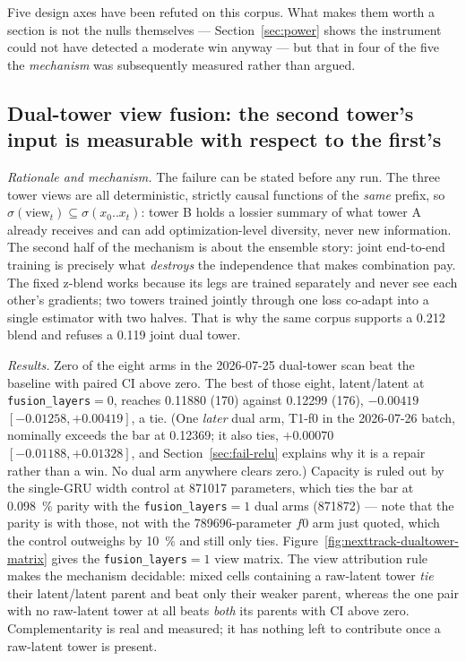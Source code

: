 \documentclass[11pt]{article}
\begin{document}
Five design axes have been refuted on this corpus. What makes them worth a
section is not the nulls themselves --- Section~\ref{sec:power} shows the
instrument could not have detected a moderate win anyway --- but that in four of
the five the \emph{mechanism} was subsequently measured rather than argued.

\subsection{Dual-tower view fusion: the second tower's input is measurable with respect to the first's}
\label{sec:fail-views}

\emph{Rationale and mechanism.} The failure can be stated before any run. The
three tower views are all deterministic, strictly causal functions of the
\emph{same} prefix, so $\sigma(\text{view}_t)\subseteq\sigma(x_0..x_t)$: tower B
holds a lossier summary of what tower A already receives and can add
optimization-level diversity, never new information. The second half of the
mechanism is about the ensemble story: joint end-to-end training is precisely
what \emph{destroys} the independence that makes combination pay. The fixed
z-blend works because its legs are trained separately and never see each other's
gradients; two towers trained jointly through one loss co-adapt into a single
estimator with two halves. That is why the same corpus supports a \num{0.212}
blend and refuses a \num{0.119} joint dual tower.

\emph{Results.} Zero of the eight arms in the 2026-07-25 dual-tower scan beat the
baseline with paired CI above zero. The best of those eight, latent/latent at
\texttt{fusion\_layers}${}=0$, reaches \num{0.11880} (\num{170}) against
\num{0.12299} (\num{176}), $-\num{0.00419}$
$[-\num{0.01258},+\num{0.00419}]$, a tie. (One \emph{later} dual arm, T1-f0 in
the 2026-07-26 batch, nominally exceeds the bar at \num{0.12369}; it also ties,
$+\num{0.00070}$ $[-\num{0.01188},+\num{0.01328}]$, and
Section~\ref{sec:fail-relu} explains why it is a repair rather than a win. No
dual arm anywhere clears zero.) Capacity is ruled out by the single-GRU width
control at \num{871017} parameters, which ties the bar at \SI{0.098}{\percent}
parity with the \texttt{fusion\_layers}${}=1$ dual arms (\num{871872}) --- note
that the parity is with those, not with the \num{789696}-parameter $f0$ arm just
quoted, which the control outweighs by \SI{10}{\percent} and still only ties.
Figure~\ref{fig:nexttrack-dualtower-matrix} gives the
\texttt{fusion\_layers}${}=1$ view matrix. The view attribution rule makes the
mechanism decidable: mixed cells
containing a raw-latent tower \emph{tie} their latent/latent parent and beat only
their weaker parent, whereas the one pair with no raw-latent tower at all beats
\emph{both} its parents with CI above zero. Complementarity is real and measured;
it has nothing left to contribute once a raw-latent tower is present.
\end{document}
